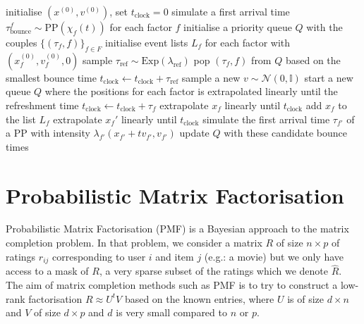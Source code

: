 %
\begin{algorithm}[!h]\small
	\caption{\label{alg:LBPS}\small {}}
	\begin{algorithmic}[1]
	\State initialise $(x^{(0)},v^{(0)})$, set $t_{\text{clock}}=0$
	\State simulate a first arrival time $\tau_{\text{bounce}}^{f}\sim \text{PP}(\chi_{f}(t))$ for each factor $f$
	\State initialise a priority queue $Q$ with the couples $\{(\tau_{f}, f)\}_{f\in F}$
	\State initialise event lists $L_{f}$ for each factor with $(x^{(0)}_{f}, v^{(0)}_{f}, 0)$
	\State sample $\tau_{\text{ref}}\sim\mathrm{Exp}(\lambda_{\text{ref}})$
		\State pop $(\tau_{f}, f)$ from $Q$ based on the smallest bounce time
			\State $t_{\text{clock}}\leftarrow t_{\text{clock}}+\tau_{\text{ref}}$
			\State sample a new $v\sim \mathcal N(0, \mathbb I)$
			\State start a new queue $Q$ where the positions for each factor is extrapolated linearly until the refreshment time
		\Else
			\State $t_{\text{clock}}\leftarrow t_{\text{clock}}+\tau_{f}$
			\State extrapolate $x_{f}$ linearly until $t_{\text{clock}}$
			\State add $x_{f}$ to the list $L_{f}$
				\State extrapolate $x_{f}'$ linearly until $t_{\text{clock}}$
				\State simulate the first arrival time $\tau_{f'}$ of a PP with intensity $\lambda_{f'}(x_{f'}+tv_{f'}, v_{f'})$
				\State update $Q$ with these candidate bounce times
			\EndFor
		\EndIf
	\EndWhile
	\end{algorithmic}
\end{algorithm}



\section{Probabilistic Matrix Factorisation}

Probabilistic Matrix Factorisation (PMF) \citep{mnih08} is a Bayesian approach to the matrix completion problem. In that problem, we consider a matrix $R$ of size $n\times p$ of ratings $r_{ij}$ corresponding to user $i$ and item $j$ (e.g.: a movie) but we only have access to a mask of $R$, a very sparse subset of the ratings which we denote $\hat R$. The aim of matrix completion methods such as PMF is to try to construct a low-rank factorisation  $R\approx U^{t}V$ based on the known entries, where $U$ is of size $d\times n$ and $V$ of size $d\times p$ and $d$ is very small compared to $n$ or $p$. 

